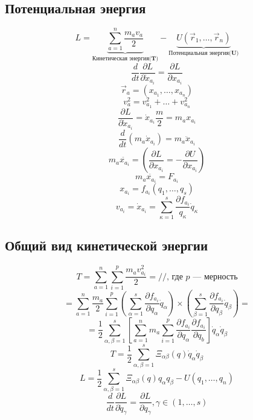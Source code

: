 \documentclass[a4paper, 12pt, titlepage, fleqn]{article}
\newcommand{\T}{\textbf}
\newcommand{\D}{\partial}
\newcommand{\Where}{\T{, где }}
\begin{document}
	 	\subsection{Потенциальная энергия}
		 	\[
			 	L = \underbrace{\sum\limits_{a = 1}^{n}\frac{m_a v_a}{2}}_{\T{Кинетическая энергия(T)}} - \underbrace{U(\vec{r}_1, \dots, \vec{r}_n)}_{\T{Потенциальная энергия(U)}}
		 	\]
		 	\[
			 	\frac{d}{dt}\frac{\D L}{\D \dot{x}_{a_i}} = \frac{\D L}{\D x_{a_i}}
		 	\]
		 	\[
			 	\vec{r}_a = (x_{a_1}, \dots, x_{a_n})
			\]
			\[
				v^2_a = v^2_{a_1} + \dots + v^2_{a_n}
			\]
			\[
				\frac{\D L}{\D \dot{x}_{a_i}} = \dot{x}_{a_i}\frac{m}{2} = m_a x_{a_i}
			\]
			\[
				\frac{d}{dt}(m_a\dot{x}_{a_i}) = m_a\ddot{x}_{a_i}
			\]
			\[
				m_a\ddot{x_{a_i}} = \left(\frac{\D L}{\D x_{a_i}} = -\frac{\D U}{\D x_{a_i}}\right)
			\]
			\[
				m_a\ddot{x_{a_i}} = F_{a_i}
			\]
			\[
				x_{a_i} = f_{a_i}(q_1, \dots, q_s)
			\]
			\[
				v_{a_i} = \dot{x}_{a_i} = \sum\limits_{\kappa = 1}^s\frac{\D f_{a_i}}{q_\kappa}\dot{q}_\kappa
			\]
		\subsection{Общий вид кинетической энергии}
			\[
				T = \sum\limits_{a = 1}^n\sum\limits_{i = 1}^p\frac{m_a v^2_{a_i}}{2} =// \Where p \T{ --- мерность}
			\]
			\[
				= \sum\limits_{a = 1}^n\frac{m_a}{2}\sum\limits_{i = 1}^p\left(\sum\limits_{\alpha = 1}^{s}\frac{\D f_{a_i}}{\D q_\alpha}\dot{q}_\alpha\right)\times\left(\sum\limits_{\beta = 1}^s\frac{\D f_{a_i}}{\D q_\beta}\dot{q}_\beta\right) =
			\]
			\[
				= \frac{1}{2}\sum\limits_{\alpha, \beta = 1}^s\left[\sum\limits_{a = 1}^n m_a \sum\limits_{i = 1}^p \frac{\D f_{a_i}}{\D q_\alpha}\frac{\D f_{a_i}}{\D q_b} \right]\dot{q}_\alpha\dot{q}_\beta
			\]
			\[
				T = \frac{1}{2}\sum\limits_{\alpha, \beta = 1}^s\Xi_{\alpha\beta}(q)\dot{q}_\alpha\dot{q}_\beta
			\]
			\[
				L = \frac{1}{2}\sum\limits_{\alpha, \beta = 1}^{s}\Xi_{\alpha\beta}(q)q_\alpha q_\beta - U(q_1, \dots, q_n)
			\]
			\[
				\frac{d}{dt}\frac{\D L}{\D \dot{q}_\gamma} = \frac{\D L}{\D q_\gamma}, \gamma \in (1, \dots, s)
			\]
\end{document}
